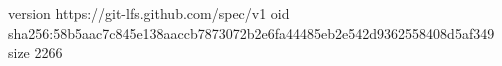 version https://git-lfs.github.com/spec/v1
oid sha256:58b5aac7c845e138aaccb7873072b2e6fa44485eb2e542d9362558408d5af349
size 2266
